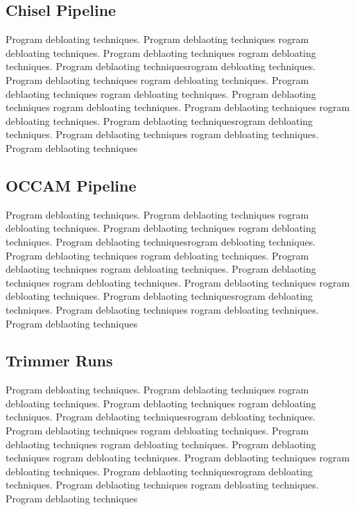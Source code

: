 \documentclass{relatorio}
\begin{document}
\subsection{Chisel Pipeline}%
\label{Tools}

Program debloating techniques. Program deblaoting techniques rogram debloating techniques. Program deblaoting techniques
rogram debloating techniques. Program deblaoting techniquesrogram debloating techniques. Program deblaoting techniques
rogram debloating techniques. Program deblaoting techniques rogram debloating techniques. Program deblaoting techniques
rogram debloating techniques. Program deblaoting techniques 
rogram debloating techniques. Program deblaoting techniquesrogram debloating techniques. Program deblaoting techniques
rogram debloating techniques. Program deblaoting techniques

\subsection{OCCAM Pipeline}%
\label{Tools}

Program debloating techniques. Program deblaoting techniques rogram debloating techniques. Program deblaoting techniques
rogram debloating techniques. Program deblaoting techniquesrogram debloating techniques. Program deblaoting techniques
rogram debloating techniques. Program deblaoting techniques rogram debloating techniques. Program deblaoting techniques
rogram debloating techniques. Program deblaoting techniques 
rogram debloating techniques. Program deblaoting techniquesrogram debloating techniques. Program deblaoting techniques
rogram debloating techniques. Program deblaoting techniques

\subsection{Trimmer Runs}%
\label{Tools}

Program debloating techniques. Program deblaoting techniques rogram debloating techniques. Program deblaoting techniques
rogram debloating techniques. Program deblaoting techniquesrogram debloating techniques. Program deblaoting techniques
rogram debloating techniques. Program deblaoting techniques rogram debloating techniques. Program deblaoting techniques
rogram debloating techniques. Program deblaoting techniques 
rogram debloating techniques. Program deblaoting techniquesrogram debloating techniques. Program deblaoting techniques
rogram debloating techniques. Program deblaoting techniques
\end{document}
